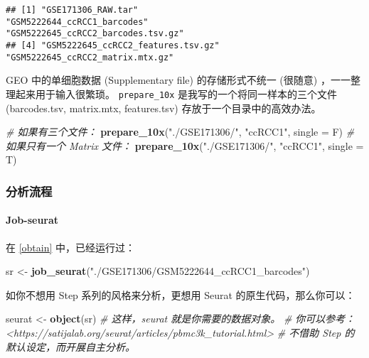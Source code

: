 \documentclass[
]{article}
\newenvironment{Shaded}{\begin{snugshade}}{\end{snugshade}}
\newcommand{\CommentTok}[1]{\textcolor[rgb]{0.56,0.35,0.01}{\textit{#1}}}
\newcommand{\DataTypeTok}[1]{\textcolor[rgb]{0.13,0.29,0.53}{#1}}
\newcommand{\KeywordTok}[1]{\textcolor[rgb]{0.13,0.29,0.53}{\textbf{#1}}}
\newcommand{\NormalTok}[1]{#1}
\newcommand{\StringTok}[1]{\textcolor[rgb]{0.31,0.60,0.02}{#1}}
\begin{document}
\begin{verbatim}
## [1] "GSE171306_RAW.tar"                 "GSM5222644_ccRCC1_barcodes"        "GSM5222645_ccRCC2_barcodes.tsv.gz"
## [4] "GSM5222645_ccRCC2_features.tsv.gz" "GSM5222645_ccRCC2_matrix.mtx.gz"
\end{verbatim}

GEO 中的单细胞数据 (Supplementary file) 的存储形式不统一 (很随意) ，一一整理起来用于输入很繁琐。
\texttt{prepare\_10x} 是我写的一个将同一样本的三个文件 (barcodes.tsv, matrix.mtx, features.tsv) 存放于一个目录中的高效办法。

\begin{Shaded}
\begin{Highlighting}[]
\CommentTok{\# 如果有三个文件：}
\KeywordTok{prepare\_10x}\NormalTok{(}\StringTok{"./GSE171306/"}\NormalTok{, }\StringTok{"ccRCC1"}\NormalTok{, }\DataTypeTok{single =}\NormalTok{ F)}
\CommentTok{\# 如果只有一个 Matrix 文件：}
\KeywordTok{prepare\_10x}\NormalTok{(}\StringTok{"./GSE171306/"}\NormalTok{, }\StringTok{"ccRCC1"}\NormalTok{, }\DataTypeTok{single =}\NormalTok{ T)}
\end{Highlighting}
\end{Shaded}

\hypertarget{ux5206ux6790ux6d41ux7a0b}{%
\subsubsection{分析流程}\label{ux5206ux6790ux6d41ux7a0b}}

\hypertarget{job-seurat}{%
\paragraph{Job-seurat}\label{job-seurat}}

在 \ref{obtain} 中，已经运行过：

\begin{Shaded}
\begin{Highlighting}[]
\NormalTok{sr \textless{}{-}}\StringTok{ }\KeywordTok{job\_seurat}\NormalTok{(}\StringTok{"./GSE171306/GSM5222644\_ccRCC1\_barcodes"}\NormalTok{)}
\end{Highlighting}
\end{Shaded}

如你不想用 Step 系列的风格来分析，更想用 Seurat 的原生代码，那么你可以：

\begin{Shaded}
\begin{Highlighting}[]
\NormalTok{seurat \textless{}{-}}\StringTok{ }\KeywordTok{object}\NormalTok{(sr)}
\CommentTok{\# 这样，\textasciigrave{}seurat\textasciigrave{} 就是你需要的数据对象。}
\CommentTok{\# 你可以参考：\textless{}https://satijalab.org/seurat/articles/pbmc3k\_tutorial.html\textgreater{}}
\CommentTok{\# 不借助 Step 的默认设定，而开展自主分析。}
\end{Highlighting}
\end{Shaded}
\end{document}
